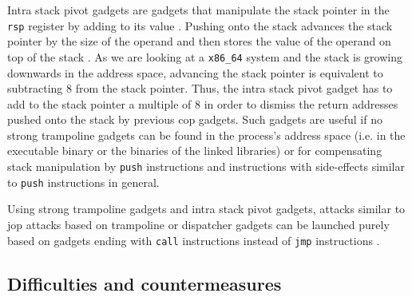 Intra stack pivot gadgets are gadgets that manipulate the stack pointer in the \texttt{rsp} register by adding to its value \cite{Sadeghi2018}.
Pushing onto the stack advances the stack pointer by the size of the operand and then stores the value of the operand on top of the stack \cite[4-513\psq]{IntelCorporation2020}.
As we are looking at a \texttt{x86\_64} system and the stack is growing downwards in the address space, advancing the stack pointer is equivalent to subtracting 8 from the stack pointer.
Thus, the intra stack pivot gadget has to add to the stack pointer a multiple of 8 in order to dismiss the return addresses pushed onto the stack by previous \gls{cop} gadgets.
Such gadgets are useful if no strong trampoline gadgets can be found in the process's address space (i.e. in the executable binary or the binaries of the linked libraries) or for compensating stack manipulation by \texttt{push} instructions and instructions with side-effects similar to \texttt{push} instructions in general.

Using strong trampoline gadgets and intra stack pivot gadgets, attacks similar to \gls{jop} attacks based on trampoline or dispatcher gadgets can be launched purely based on gadgets ending with \texttt{call} instructions instead of \texttt{jmp} instructions \cite{Sadeghi2018}.

\subsection{Difficulties and countermeasures}
\label{subsec:cr-countermeasures}
